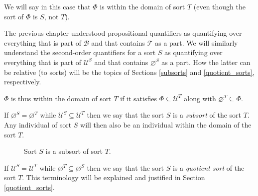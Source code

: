 \documentclass[12pt]{book}
\begin{document}
We will say in this case that $\Phi$ is within the domain of sort $T$ (even though the sort of $\Phi$ is $S$, not $T$).

The previous chapter understood propositional quantifiers as quantifying over everything that is part of $\mathcal{B}$ and that contains $\mathcal{T}$ as a part. We will similarly understand the second-order quantifiers for a sort $S$ as quantifying over everything that is part of $\mathcal{U}^S$ and that contains $\varnothing^S$ as a part. How the latter can be relative (to sorts) will be the topics of Sections \ref{subsorts} and \ref{quotient_sorts}, respectively.

$\Phi$ is thus within the domain of sort $T$ if it satisfies $\Phi \subseteq \mathcal{U}^T$ along with $\varnothing^T \subseteq \Phi$.

If $\varnothing^S = \varnothing^T$ while $\mathcal{U}^S \subseteq \mathcal{U}^T$ then we say that the sort $S$ is a \textit{subsort} of the sort $T$. Any individual of sort $S$ will then also be an individual within the domain of the sort $T$.

\begin{figure}[htbp]
\centering
{}
\caption{Sort $S$ is a subsort of sort $T$.}
\label{fig:diamonds}
\end{figure}

If $\mathcal{U}^S = \mathcal{U}^T$ while $\varnothing^T \subseteq \varnothing^S$ then we say that the sort $S$ is a \textit{quotient sort} of the sort $T$. This terminology will be explained and justified in Section \ref{quotient_sorts}.
\end{document}
